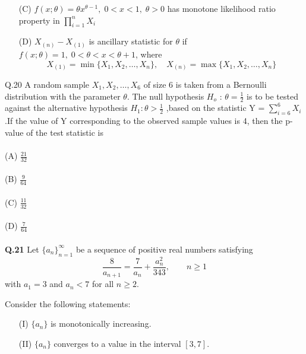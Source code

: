 \documentclass{book}[200pt]
\begin{document}
{\begin{enumerate}
	\item[(C)] 
	$f(x; \theta) = \theta x^{\theta - 1},\; 0 < x < 1,\; \theta > 0$
	has monotone likelihood ratio property in 
	$
	\prod_{i=1}^{n} X_i
	$
	\\
	\item[(D)] 
	$X_{(n)} - X_{(1)}$ is ancillary statistic for $\theta$ if 
	$f(x;\theta)=1,\; 0 < \theta < x < \theta+1$, where 
	\[
	X_{(1)} = \min\{X_1, X_2, \ldots, X_n\}, 
	\quad 
	X_{(n)} = \max\{X_1, X_2, \ldots, X_n\}
	\]
\end{enumerate}
Q.20 A random sample $X_1,X_2, \dots, X_6$ of size 6 is taken from a Bernoulli distribution with
the parameter $\theta$. The null hypothesis $H_o$ : $\theta = \frac{1}{2}$ is to be tested against the alternative hypothesis $H_1 : \theta > \frac{1}{2}$ ,based on the statistic Y = $\sum_{i=6}^{6}X_i$.If the value of Y
corresponding to the observed sample values is 4, then the p-value of the test
statistic is\\
\\
(A) $\frac{21}{32}$\\
\\
(B) $\frac{
9}{64}$\\
\\
(C) $\frac{11}{32}$\\
\\
(D) $\frac{7}{64}$\\
\\
\textbf{Q.21} 
Let $\{a_n\}_{n=1}^{\infty}$ be a sequence of positive real numbers satisfying 
\[
\frac{8}{a_{n+1}} = \frac{7}{a_n} + \frac{a_n^2}{343}, 
\qquad n \geq 1
\]
with $a_1 = 3$ and $a_n < 7$ for all $n \geq 2$. 

Consider the following statements:
\begin{enumerate}
	\item[(I)] $\{a_n\}$ is monotonically increasing.
	\item[(II)] $\{a_n\}$ converges to a value in the interval $[3,7]$.
\end{enumerate}

}
\end{document}
